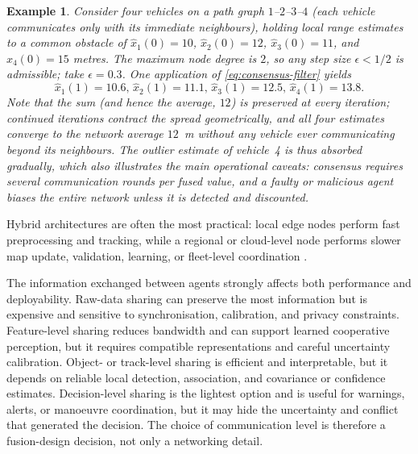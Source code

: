 \documentclass[11pt,oneside,openany]{book}
\newtheorem{example}{Example}[chapter]
\begin{document}
{\color{RevisionOlive}
\begin{example}
Consider four vehicles on a path graph $1$--$2$--$3$--$4$ (each vehicle communicates only with its immediate neighbours), holding local range estimates to a common obstacle of $\widehat{x}_1(0)=10$, $\widehat{x}_2(0)=12$, $\widehat{x}_3(0)=11$, and $\widehat{x}_4(0)=15$ metres. The maximum node degree is $2$, so any step size $\epsilon<1/2$ is admissible; take $\epsilon=0.3$. One application of \eqref{eq:consensus-filter} yields
\begin{equation*}
\widehat{x}_1(1)=10.6,\,
\widehat{x}_2(1)=11.1,\,
\widehat{x}_3(1)=12.5,\,
\widehat{x}_4(1)=13.8.
\end{equation*}
Note that the sum (and hence the average, $12$) is preserved at every iteration; continued iterations contract the spread geometrically, and all four estimates converge to the network average $12$~m without any vehicle ever communicating beyond its neighbours. The outlier estimate of vehicle~4 is thus absorbed gradually, which also illustrates the main operational caveats: consensus requires several communication rounds per fused value, and a faulty or malicious agent biases the entire network unless it is detected and discounted.
\end{example}
}

Hybrid architectures are often the most practical: local edge nodes perform fast preprocessing and tracking, while a regional or cloud-level node performs slower map update, validation, learning, or fleet-level coordination \cite{deng_edge_2021,lim_federated_2020}.

The information exchanged between agents strongly affects both performance and deployability. Raw-data sharing can preserve the most information but is expensive and sensitive to synchronisation, calibration, and privacy constraints. Feature-level sharing reduces bandwidth and can support learned cooperative perception, but it requires compatible representations and careful uncertainty calibration. Object- or track-level sharing is efficient and interpretable, but it depends on reliable local detection, association, and covariance or confidence estimates. Decision-level sharing is the lightest option and is useful for warnings, alerts, or manoeuvre coordination, but it may hide the uncertainty and conflict that generated the decision. The choice of communication level is therefore a fusion-design decision, not only a networking detail.
\end{document}
